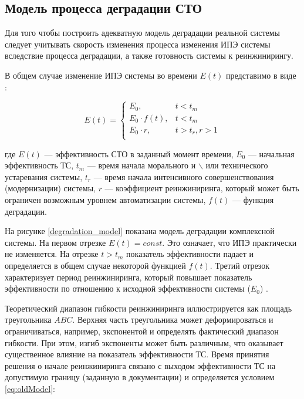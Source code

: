 \subsection{Модель процесса деградации СТО}
Для того чтобы построить адекватную модель деградации реальной системы следует учитывать скорость изменения процесса изменения ИПЭ системы вследствие процесса деградации, а также готовность системы к реинжинирингу. 

В общем случае изменение ИПЭ системы во времени $E(t)$ представимо в виде \cite{Doronina}:

\begin{equation} \label{eq:oldModel}
    E(t) = \begin{cases}
        E_0,            &  t<t_m         \\
        E_0 \cdot f(t), &  t<t_m         \\
        E_0 \cdot r,          &  t>t_r, r>1 \\
    \end{cases}
\end{equation}
\vspace{0.5em}

\noindent
где $E(t)$ --- эффективность СТО в заданный момент времени,
$E_0$ --- начальная эффективность ТС, 
$t_m$ --- время начала морального и $\backslash$ или технического устаревания системы,
$t_r$ --- время начала интенсивного совершенствования (модернизации) системы,
$r$ --- коэффициент реинжиниринга, который может быть ограничен возможным уровнем автоматизации системы,
$f(t)$ --- функция деградации.

На рисунке \ref{degradation_model} показана модель деградации комплексной системы. 
На первом отрезке $E(t) = const$. 
Это означает, что ИПЭ практически не изменяется. 
На отрезке $t > t_m$ показатель эффективности падает и определяется в общем случае некоторой функцией $f(t)$. 
Третий отрезок характеризует период реинжиниринга, который повышает показатель эффективности по отношению к исходной эффективности системы ($E_0$) \cite{Doronina}.


Теоретический диапазон гибкости реинжиниринга иллюстрируется как площадь треугольника $ABC$. 
Верхняя часть треугольника может деформироваться и ограничиваться, например, экспонентой и определять фактический диапазон гибкости. 
При этом, изгиб экспоненты может быть различным, что оказывает существенное влияние на показатель эффективности ТС. 
Время принятия решения о начале реинжиниринга связано с выходом эффективности ТС на допустимую границу (заданную в документации) и определяется условием \ref{eq:oldModel}:

